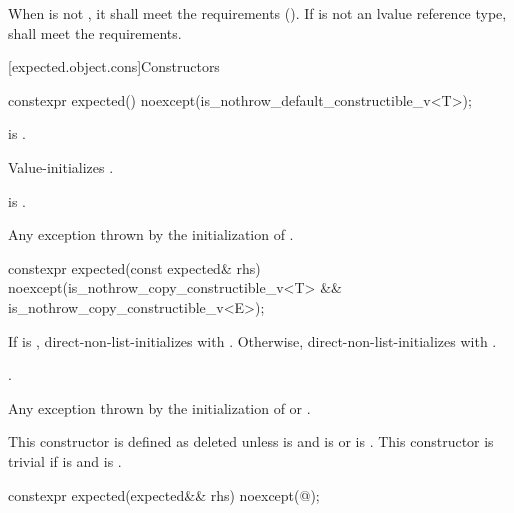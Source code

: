 \pnum
When  is not \cv{} , it shall meet the  requirements (). If  is not an lvalue reference type,  shall meet the  requirements.


[expected.object.cons]{Constructors}

%
\begin{itemdecl}
constexpr expected() noexcept(is_nothrow_default_constructible_v<T>);
\end{itemdecl}

\begin{itemdescr}
\pnum
\constraints
{} is .

\pnum
\effects
Value-initializes .

\pnum
\ensures
{} is .

\pnum
\throws
Any exception thrown by the initialization of .
\end{itemdescr}

%
\begin{itemdecl}
constexpr expected(const expected& rhs) noexcept(is_nothrow_copy_constructible_v<T> &&
                                                 is_nothrow_copy_constructible_v<E>);
\end{itemdecl}

\begin{itemdescr}

\pnum
\effects
If  is , direct-non-list-initializes  with . Otherwise, direct-non-list-initializes  with .

\pnum
\ensures
{}.

\pnum
\throws
Any exception thrown by the initialization of  or .

\pnum
\remarks
This constructor is defined as deleted unless  is  and  is  or  is . This constructor is trivial if  is  and  is .
\end{itemdescr}

%
\begin{itemdecl}
constexpr expected(expected&& rhs) noexcept(@\seebelow@);
\end{itemdecl}

